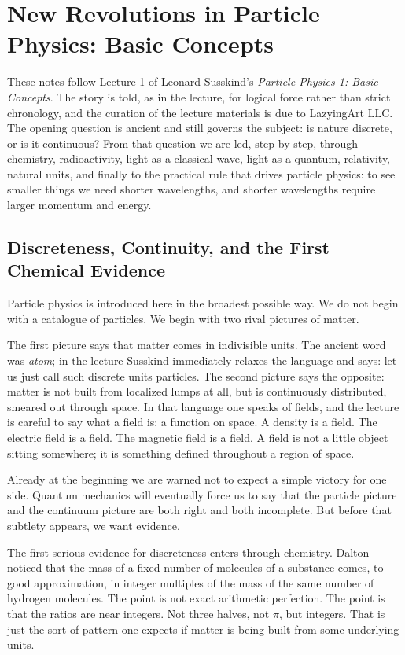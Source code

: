 \chapter{New Revolutions in Particle Physics: Basic Concepts}

These notes follow Lecture 1 of Leonard Susskind's \emph{Particle Physics 1: Basic Concepts}. The story is told, as in the lecture, for logical force rather than strict chronology, and the curation of the lecture materials is due to LazyingArt LLC. The opening question is ancient and still governs the subject: is nature discrete, or is it continuous? From that question we are led, step by step, through chemistry, radioactivity, light as a classical wave, light as a quantum, relativity, natural units, and finally to the practical rule that drives particle physics: to see smaller things we need shorter wavelengths, and shorter wavelengths require larger momentum and energy.

\section{Discreteness, Continuity, and the First Chemical Evidence}

Particle physics is introduced here in the broadest possible way. We do not begin with a catalogue of particles. We begin with two rival pictures of matter.

The first picture says that matter comes in indivisible units. The ancient word was \emph{atom}; in the lecture Susskind immediately relaxes the language and says: let us just call such discrete units particles. The second picture says the opposite: matter is not built from localized lumps at all, but is continuously distributed, smeared out through space. In that language one speaks of fields, and the lecture is careful to say what a field is: a function on space. A density is a field. The electric field is a field. The magnetic field is a field. A field is not a little object sitting somewhere; it is something defined throughout a region of space.

Already at the beginning we are warned not to expect a simple victory for one side. Quantum mechanics will eventually force us to say that the particle picture and the continuum picture are both right and both incomplete. But before that subtlety appears, we want evidence.

The first serious evidence for discreteness enters through chemistry. Dalton noticed that the mass of a fixed number of molecules of a substance comes, to good approximation, in integer multiples of the mass of the same number of hydrogen molecules. The point is not exact arithmetic perfection. The point is that the ratios are near integers. Not three halves, not \(\pi\), but integers. That is just the sort of pattern one expects if matter is being built from some underlying units.

